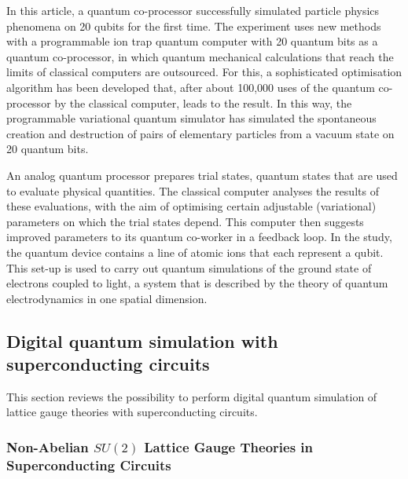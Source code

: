 \documentclass[epj,final]{svjour}
\begin{document}
In this article, a quantum co-processor successfully simulated particle physics phenomena on 20 qubits for the first time. The experiment uses new methods with a programmable ion trap quantum computer with 20 quantum bits as a quantum co-processor, in which quantum mechanical calculations that reach the limits of classical computers are outsourced. For this, a sophisticated optimisation algorithm has been developed that, after about 100,000 uses of the quantum co-processor by the classical computer, leads to the result. In this way, the programmable variational quantum simulator has simulated the spontaneous creation and destruction of pairs of elementary particles from a vacuum state on 20 quantum bits.

An analog quantum processor prepares trial states, quantum states that are used to evaluate physical quantities. The classical computer analyses the results of these evaluations, with the aim of optimising certain adjustable (variational) parameters on which the trial states depend. This computer then suggests improved parameters to its quantum co-worker in a feedback loop. In the study, the quantum device contains a line of atomic ions that each represent a qubit. This set-up is used to carry out quantum simulations of the ground state of electrons coupled to light, a system that is described by the theory of quantum electrodynamics in one spatial dimension. 

\subsection{Digital quantum simulation with superconducting circuits}

This section reviews the possibility to perform digital quantum simulation of lattice gauge theories with superconducting circuits\cite{mezzacapo2015non}.

\subsubsection{Non-Abelian $SU(2)$ Lattice Gauge Theories in Superconducting Circuits\cite{mezzacapo2015non}}
\end{document}
